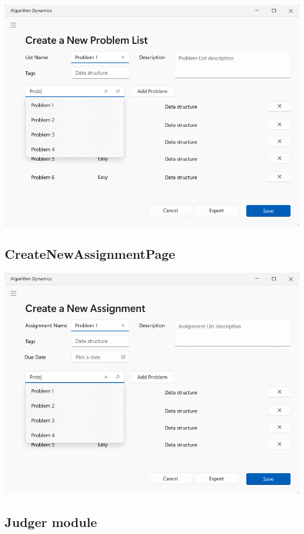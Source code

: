 \documentclass[a4paper]{report}
\begin{document}
\includegraphics[width=\textwidth, height=\textheight, keepaspectratio]{CreateNewProblemListPage-design}

\subsection{CreateNewAssignmentPage}

\includegraphics[width=\textwidth, height=\textheight, keepaspectratio]{CreateNewAssignmentPage-design}

\subsection{Judger module}
\end{document}
